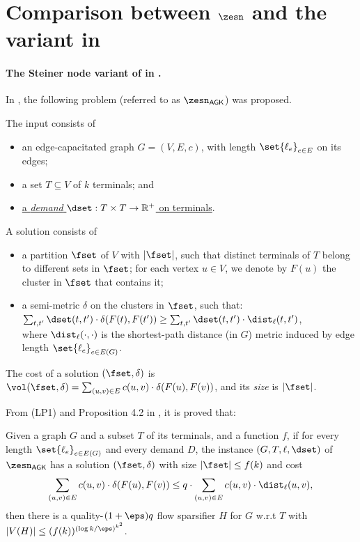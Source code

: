 \section{Comparison between $\zesn$ and the variant in \cite{andoni2014towards}}
\label{sec: compare}

\paragraph{The Steiner node variant of \ze in \cite{andoni2014towards}.}
In \cite{andoni2014towards}, the following problem (referred to as $\zesn_{\textsf{AGK}}$) was proposed.

The input consists of
\begin{itemize}
\item an edge-capacitated graph $G=(V,E,c)$,  with length $\set{\ell_e}_{e\in E}$ on its edges;
\item a set $T\subseteq V$ of $k$ terminals; and
\item \underline{a \emph{demand} $\dset: T\times T\to \mathbb{R}^+$ on terminals}.
\end{itemize}
A solution consists of 
\begin{itemize}
	\item a partition $\fset$ of $V$ with $|\fset|$, such that distinct terminals of $T$ belong to different sets in $\fset$; for each vertex $u\in V$, we denote by $F(u)$ the cluster in $\fset$ that contains it;
	\item a semi-metric $\delta$ on the clusters in $\fset$, such that:\\ \underline{$\sum_{t,t'}\dset(t,t')\cdot\delta(F(t),F(t'))\ge \sum_{t,t'} \dset(t,t')\cdot\dist_{\ell}(t,t')$},\\
	where $\dist_{\ell}(\cdot,\cdot)$ is the shortest-path distance (in $G$) metric induced by edge length $\set{\ell_e}_{e\in E(G)}$.
\end{itemize}
The cost of a solution $(\fset,\delta)$ is $\vol(\fset,\delta)=\sum_{(u,v)\in E}c(u,v)\cdot\delta(F(u),F(v))$, and its \emph{size} is $|\fset|$.

From (LP1) and Proposition 4.2 in \cite{andoni2014towards}, it is proved that:
\begin{proposition}
Given a graph $G$ and a subset $T$ of its terminals, and a function $f$, if for every length $\set{\ell_e}_{e\in E(G)}$ and every demand $D$, the instance $(G,T,\ell,\dset)$ of $\zesn_{\textsf{AGK}}$ has a solution $(\fset,\delta)$ with size $|\fset|\le f(k)$ and cost 
\[\sum_{(u,v)\in E}c(u,v)\cdot\delta(F(u),F(v))\le q\cdot \sum_{(u,v)\in E}c(u,v)\cdot\dist_{\ell}(u,v),\] 
then there is a quality-$(1+\eps) q$ flow sparsifier $H$ for $G$ w.r.t $T$ with $|V(H)|\le (f(k))^{(\log k/\eps)^{k^2}}$.
\end{proposition}

